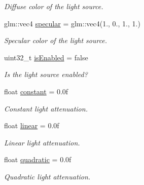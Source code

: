 \begin{DoxyCompactItemize}
\begin{DoxyCompactList}\small\item\em Diffuse color of the light source. \end{DoxyCompactList}\item 
\mbox{\label{struct_light_a083c715bd3f644581975c3d0192ceebb}} 
glm\+::vec4 \mbox{\hyperlink{struct_light_a083c715bd3f644581975c3d0192ceebb}{specular}} = glm\+::vec4(1., 0., 1., 1.)
\begin{DoxyCompactList}\small\item\em Specular color of the light source. \end{DoxyCompactList}\item 
\mbox{\label{struct_light_a775f938a7e4fd7f6c225d67ec99d4061}} 
uint32\+\_\+t \mbox{\hyperlink{struct_light_a775f938a7e4fd7f6c225d67ec99d4061}{is\+Enabled}} = false
\begin{DoxyCompactList}\small\item\em Is the light source enabled? \end{DoxyCompactList}\item 
\mbox{\label{struct_light_a3e211778e131611d35039827f36f51e5}} 
float \mbox{\hyperlink{struct_light_a3e211778e131611d35039827f36f51e5}{constant}} = 0.\+0f
\begin{DoxyCompactList}\small\item\em Constant light attenuation. \end{DoxyCompactList}\item 
\mbox{\label{struct_light_a9d89a84a196a1329cda29df47a937e28}} 
float \mbox{\hyperlink{struct_light_a9d89a84a196a1329cda29df47a937e28}{linear}} = 0.\+0f
\begin{DoxyCompactList}\small\item\em Linear light attenuation. \end{DoxyCompactList}\item 
\mbox{\label{struct_light_a0427bec0c2333a5dd9a18b2c282d952e}} 
float \mbox{\hyperlink{struct_light_a0427bec0c2333a5dd9a18b2c282d952e}{quadratic}} = 0.\+0f
\begin{DoxyCompactList}\small\item\em Quadratic light attenuation. \end{DoxyCompactList}\item 

\end{DoxyCompactItemize}
